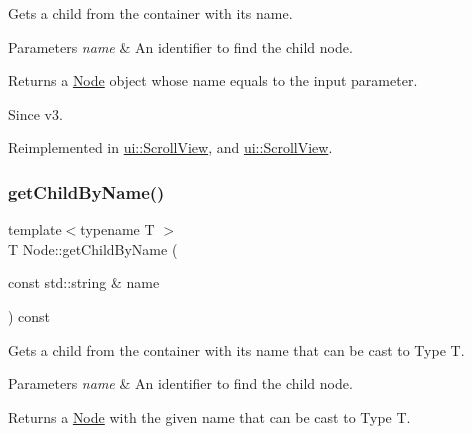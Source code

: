 Gets a child from the container with its name.


\begin{DoxyParams}{Parameters}
{\em name} & An identifier to find the child node.\\
\hline
\end{DoxyParams}
\begin{DoxyReturn}{Returns}
a \hyperlink{classNode}{Node} object whose name equals to the input parameter.
\end{DoxyReturn}
\begin{DoxySince}{Since}
v3. 
\end{DoxySince}


Reimplemented in \hyperlink{classui_1_1ScrollView_ab61ab552b7ea1fb1ebff43f34441a876}{ui\+::\+Scroll\+View}, and \hyperlink{classui_1_1ScrollView_a9750342974b85647eac63dc49db4292f}{ui\+::\+Scroll\+View}.

\mbox{\label{classNode_abbd6d0f2c3d65db94ea75d16402f83a2}} 
\subsubsection{\texorpdfstring{get\+Child\+By\+Name()}{getChildByName()}\hspace{0.1cm}{\footnotesize\ttfamily [4/4]}}
{\footnotesize\ttfamily template$<$typename T $>$ \\
T Node\+::get\+Child\+By\+Name (\begin{DoxyParamCaption}\item[{const std\+::string \&}]{name }\end{DoxyParamCaption}) const\hspace{0.3cm}{\ttfamily [inline]}}

Gets a child from the container with its name that can be cast to Type T.


\begin{DoxyParams}{Parameters}
{\em name} & An identifier to find the child node.\\
\hline
\end{DoxyParams}
\begin{DoxyReturn}{Returns}
a \hyperlink{classNode}{Node} with the given name that can be cast to Type T. 
\end{DoxyReturn}
\mbox{\label{classNode_a8eebd018aa7ebebb674d1649e1a79cac}} 
